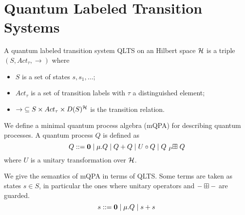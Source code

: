 %



\section{Quantum Labeled Transition Systems}

A quantum labeled transition system QLTS on an Hilbert space $\mathcal{H}$ is a triple $(S, Act_\tau, \rightarrow)$ where
\begin{itemize}
	\item $S$ is a set of states $s, s_1, \dots$;
	\item $Act_\tau$ is a set of transition labels with $\tau$ a distinguished element;
	\item $\rightarrow\;\subseteq S \times Act_\tau \times D(S)^{\mathcal{H}}$ is the transition relation. 
\end{itemize}

We define a minimal quantum process algebra (mQPA) for describing quantum processes.
A quantum process $Q$ is defined as
\[
Q ::= \nil \mid \mu.Q \mid Q + Q \mid U \circ Q \mid Q \qsum{P} Q
\]
where $U$ is a unitary transformation over $\mathcal{H}$.

We give the semantics of mQPA in terms of QLTS.
Some terms are taken as states $s \in S$, in particular the ones where unitary operators and ${-} \boxplus {-}$ are guarded.
\[
s ::= \mathbf{0} \mid \mu.Q \mid s + s
\]

